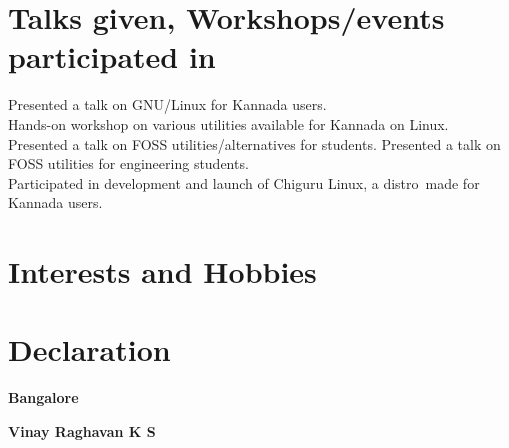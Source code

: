 \documentclass[11pt,a4paper,sans]{moderncv}
\begin{document}
\section{Talks given, Workshops/events participated in}
{Presented a talk on GNU/Linux for Kannada users. \\
Hands-on workshop on various utilities available for Kannada on Linux.}
{Presented a talk on FOSS utilities/alternatives for students.} 
{Presented a talk on FOSS utilities for engineering students. \\
Participated in development and launch of Chiguru Linux, a distro\
made for Kannada users.}

\section{Interests and Hobbies}

\section{Declaration}

\begin{minipage}{0.5\textwidth}
\begin{flushleft}
  \large
\bfseries Bangalore
\end{flushleft}
\end{minipage}
\begin{minipage}{0.5\textwidth}

\begin{flushright}
  \large
\bfseries Vinay Raghavan \textsc{K S}
\end{flushright}
\end{minipage}

\end{document}
